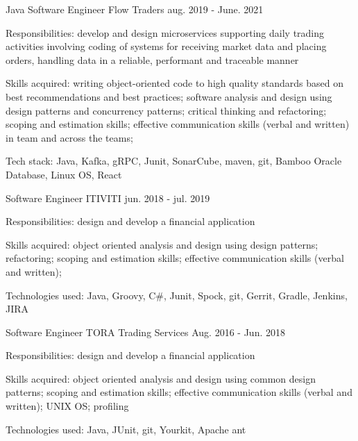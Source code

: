 \begin{cventries}
  \cventry
    {Java Software Engineer} %
    {Flow Traders} %
    {} %
    {aug. 2019 - June. 2021} %
    {
      \begin{cvitems} %
        \item {Responsibilities: develop and design microservices supporting daily trading activities involving coding of systems for receiving market data and placing orders, handling data in a reliable, performant and traceable manner}
        \item {Skills acquired: writing object-oriented code to high quality standards based on best recommendations and best practices; software analysis and design using design patterns and concurrency patterns; critical thinking and refactoring; scoping and estimation skills; effective communication skills (verbal and written) in team and across the teams;}
        \item {Tech stack: Java, Kafka, gRPC, Junit, SonarCube, maven, git, Bamboo Oracle Database, Linux OS, React}
      \end{cvitems}
    }

  \cventry
    {Software Engineer} %
    {ITIVITI} %
    {} %
    {jun. 2018 - jul. 2019} %
    {
      \begin{cvitems} %
        \item {Responsibilities: design and develop a financial application}
        \item {Skills acquired: object oriented analysis and design using design patterns; refactoring; scoping and estimation skills; effective communication skills (verbal and written);}
        \item {Technologies used: Java, Groovy, C\#, Junit, Spock, git, Gerrit, Gradle, Jenkins, JIRA}
      \end{cvitems}
    }

  \cventry
    {Software Engineer} %
    {TORA Trading Services} %
    {} %
    {Aug. 2016 - Jun. 2018} %
    {
      \begin{cvitems} %
        \item {Responsibilities: design and develop a financial application}
        \item {Skills acquired: object oriented analysis and design using common design patterns; scoping and estimation skills; effective communication skills (verbal and written); UNIX OS; profiling}
        \item {Technologies used: Java, JUnit, git, Yourkit, Apache ant}
      \end{cvitems}
    }
\end{cventries}
